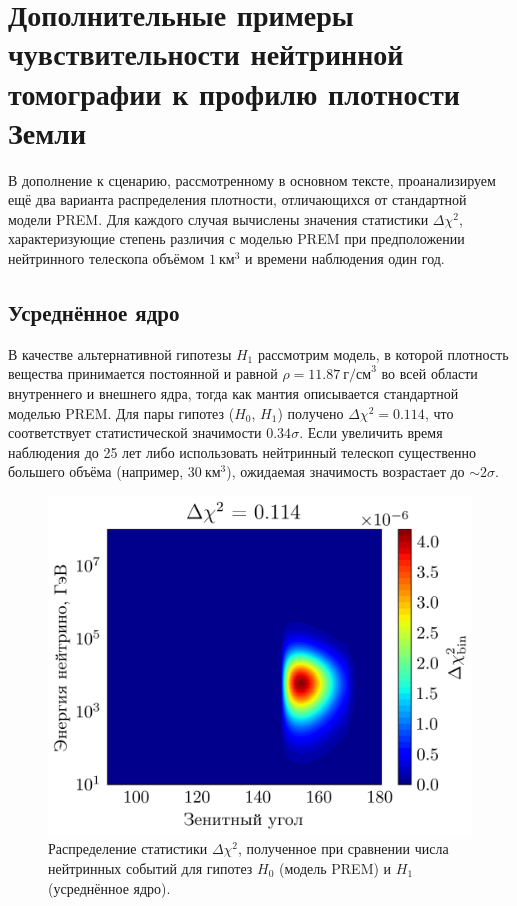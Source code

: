 \section{Дополнительные примеры чувствительности нейтринной томографии к профилю плотности Земли}
\label{sec:appTomography}

В дополнение к сценарию, рассмотренному в основном тексте, проанализируем ещё два варианта распределения плотности, отличающихся от стандартной модели PREM.  
Для каждого случая вычислены значения статистики $\Delta\chi^2$, характеризующие степень различия с моделью PREM при предположении нейтринного телескопа объёмом $1~\text{км}^3$ и времени наблюдения один год.

\subsection{Усреднённое ядро}

В качестве альтернативной гипотезы $H_1$ рассмотрим модель, в которой плотность вещества принимается постоянной и равной $\rho = 11.87~\text{г/см}^3$ во всей области внутреннего и внешнего ядра, тогда как мантия описывается стандартной моделью PREM.  
Для пары гипотез ($H_0$, $H_1$) получено $\Delta\chi^2 = 0.114$, что соответствует статистической значимости $0.34\sigma$.  
Если увеличить время наблюдения до 25 лет либо использовать нейтринный телескоп существенно большего объёма (например, $30~\text{км}^3$), ожидаемая значимость возрастает до $\sim 2\sigma$.

\begin{figure}[!h]
    \centering
    \includegraphics[width=\linewidth]{images/NuProp/chi2_rzf_2dxsCT10nlo_PREM_vs_PREM_av_ext_ker.png}
    \caption{Распределение статистики $\Delta\chi^2$, полученное при сравнении числа нейтринных событий для гипотез $H_0$ (модель PREM) и $H_1$ (усреднённое ядро).}
    \label{NuTom2}
\end{figure}

